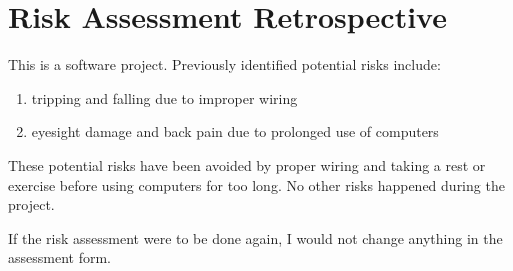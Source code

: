 \chapter{Risk Assessment Retrospective} 

This is a software project. Previously identified potential risks include:
\begin{enumerate}
	\item tripping and falling due to improper wiring
	\item eyesight damage and back pain due to prolonged use of computers
\end{enumerate}
These potential risks have been avoided by proper wiring and taking a rest or exercise before using computers for too long. No other risks happened during the project.

If the risk assessment were to be done again, I would not change anything in the assessment form. 